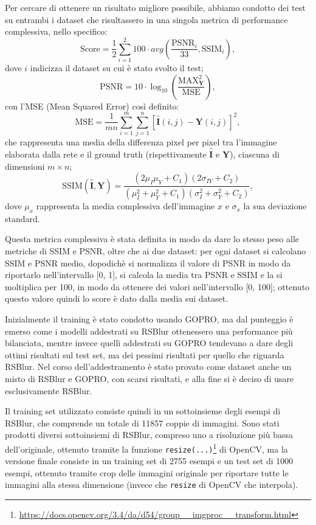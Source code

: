 \documentclass[a4paper,10pt,twocolumn]{article}
\begin{document}
Per cercare di ottenere un risultato migliore possibile, abbiamo condotto dei test su entrambi i dataset che risultassero in una singola metrica di performance complessiva, nello specifico:
\[ \text{Score} = \frac{1}{2}\sum_{i=1}^2 100 \cdot avg(\frac{\text{PSNR}_i}{33}, \text{SSIM}_i), \]
dove $i$ indicizza il dataset su cui è stato svolto il test;
\[ \text{PSNR} = 10 \cdot \log_{10} ( \frac{\text{MAX}_{\mathbf{Y}}^2}{\text{MSE}} ), \]
con l'MSE (Mean Squared Error) così definito: 
\[ \text{MSE} = \frac{1}{mn} \sum_{i=1}^{m} \sum_{j=1}^{n} {[\hat{\mathbf{I}}(i,j) - \mathbf{Y}(i,j)]}^2, \]
che rappresenta una media della differenza pixel per pixel tra l'immagine elaborata dalla rete e il ground truth (rispettivamente \(\hat{\mathbf{I}}\) e \(\mathbf{Y}\)), ciascuna di dimensioni \(m \times n\);
\[ \text{SSIM}(\hat{\mathbf{I}}, \mathbf{Y}) = \frac{(2 \mu_I \mu_Y + C_1)(2 \sigma_{IY} + C_2)}{(\mu_I^2 + \mu_Y^2 + C_1)(\sigma_I^2 + \sigma_Y^2 + C_2)}, \]
dove \(\mu_x\) rappresenta la media complessiva dell'immagine \(x\) e \(\sigma_x\) la sua deviazione standard.

Questa metrica complessiva è stata definita in modo da dare lo stesso peso alle metriche di SSIM e PSNR, oltre che ai due dataset: per ogni dataset si calcolano SSIM e PSNR medio, dopodichè si normalizza
il valore di PSNR in modo da riportarlo nell'intervallo [0, 1], si calcola la media tra PSNR e SSIM e la si moltiplica per 100, in modo da ottenere dei valori nell'intervallo [0, 100]; ottenuto questo valore quindi lo score è dato dalla media sui dataset.

Inizialmente il training è stato condotto usando GOPRO, ma dal punteggio è emerso come i modelli addestrati su RSBlur ottenessero una performance più bilanciata, mentre invece quelli addestrati su GOPRO tendevano a dare degli ottimi risultati sul test set, ma dei pessimi
risultati per quello che riguarda RSBlur. Nel corso dell'addestramento è stato provato come dataset anche un misto di RSBlur e GOPRO, con scarsi risultati, e alla fine si è deciso di usare esclusivamente RSBlur.

Il training set utilizzato consiste quindi in un sottoinsieme degli esempi di RSBlur, che comprende un totale di 11857 coppie di immagini. Sono stati prodotti diversi sottoinsiemi di RSBlur, compreso uno a risoluzione più bassa dell'originale, ottenuto tramite la funzione \texttt{resize(...)}\footnote{\url{https://docs.opencv.org/3.4/da/d54/group__imgproc__transform.html}} di OpenCV,
ma la versione finale consiste in un training set di 2755 esempi e un test set di 1000 esempi, ottenuto tramite crop delle immagini originale per riportare tutte le immagini alla stessa dimensione (invece che \texttt{resize} di OpenCV che interpola).
\end{document}
